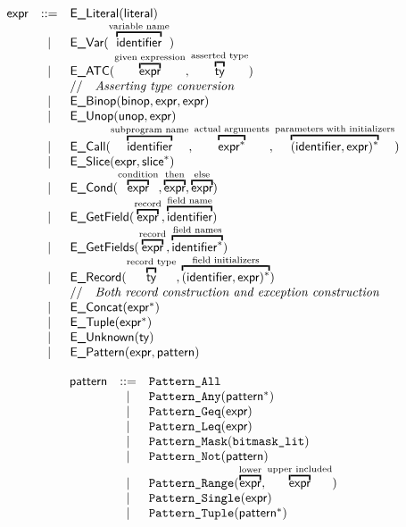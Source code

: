 \documentclass{book}
\begin{document}
\[
\begin{array}{rcl}
\expr &::=& \ELiteral(\literal) \\
	&|& \EVar(\overtext{\identifier}{variable name}) \\
	&|& \EATC(\overtext{\expr}{given expression}, \overtext{\ty}{asserted type}) \\
  & & \ASTComment{Asserting type conversion}\\
	&|& \EBinop(\binop, \expr, \expr) \\
	&|& \EUnop(\unop, \expr) \\
	&|& \ECall(\overtext{\identifier}{subprogram name}, \overtext{\expr^{*}}{actual arguments}, \overtext{(\identifier, \expr)^{*}}{parameters with initializers}) \\
	&|& \ESlice(\expr, \slice^{*}) \\
	&|& \ECond(\overtext{\expr}{condition}, \overtext{\expr}{then}, \overtext{\expr}{else}) \\
	&|& \EGetField(\overtext{\expr}{record}, \overtext{\identifier}{field name}) \\
	&|& \EGetFields(\overtext{\expr}{record}, \overtext{\identifier^{*}}{field names}) \\
	&|& \ERecord(\overtext{\ty}{record type}, \overtext{(\identifier, \expr)^{*}}{field initializers})\\
    & & \ASTComment{Both record construction and exception construction}\\
	&|& \EConcat(\expr^{*}) \\
	&|& \ETuple(\expr^{*}) \\
	&|& \EUnknown(\ty) \\
	&|& \EPattern(\expr, \pattern)
\end{array}
\]

\[
\begin{array}{rcl}
\pattern &::=& \texttt{Pattern\_All} \\
  &|& \texttt{Pattern\_Any}(\pattern^{*}) \\
  &|& \texttt{Pattern\_Geq}(\expr) \\
  &|& \texttt{Pattern\_Leq}(\expr) \\
  &|& \texttt{Pattern\_Mask}(\texttt{bitmask\_lit}) \\
  &|& \texttt{Pattern\_Not}(\pattern) \\
  &|& \texttt{Pattern\_Range}(\overtext{\expr}{lower}, \overtext{\expr}{upper included})\\
  &|& \texttt{Pattern\_Single}(\expr) \\
  &|& \texttt{Pattern\_Tuple}(\pattern^{*}) \\
\end{array}
\]
\end{document}
